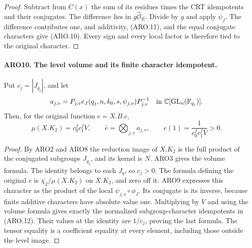 \begin{proof}
Subtract from \(C(x)\) the sum of its residues times the CRT
idempotents and their conjugates.  The difference lies in
\(g\widehat{\mathcal O}_E\).  Divide by \(g\) and apply \(\psi_f\).
The difference contributes one, and additivity, (ARO.11), and the
equal conjugate characters give (ARO.10).  Every sign and every
local factor is therefore tied to the original character.
\end{proof}

\paragraph{ARO10. The level volume and its finite character idempotent.}
\label{claim:ARO10}
Put \(c_j=|J_{q_j}|\), and let
\[
 a_{j,v}=P_{j,v}e_J(q_j,n,k_0,s,\psi_{j,v})P_{j,v}^{-1}
                 \quad\hbox{in }\mathbb C[\mathrm{GL}_n(\mathbb F_{q_j})].
\]
Then, for the original function \(e=X.B.e\),
\[
 \mu(X.K_2)=c_0^f c_1^f V,
 \qquad \widehat e=\bigotimes_{j,v}a_{j,v},
 \qquad e(1)=\frac1{c_0^f c_1^f V}>0.                 \tag{ARO.12}
\]
\begin{proof}
By ARO2 and ARO8 the reduction image of \(X.K_2\) is the full
product of the conjugated subgroups \(J_{q_j}\), and its kernel is
\(N\).  ARO3 gives the volume formula.  The identity belongs to
each \(J_q\), so \(c_j>0\).  The formula defining the original
\(e\) is \(\overline{\chi_2}/\mu(X.K_2)\) on \(X.K_2\),
and zero off it.  ARO9 expresses this character as the product of
the local \(\psi_{j,v}\circ\phi_J\).  Its conjugate is its
inverse, because finite additive characters have absolute value
one.  Multiplying by \(V\) and using the volume formula gives
exactly the normalized subgroup-character idempotents in (ARO.12).
Their values at the identity are \(1/c_j\), proving the last
formula.  The tensor equality is a coefficient equality at every
element, including those outside the level image.
\end{proof}

